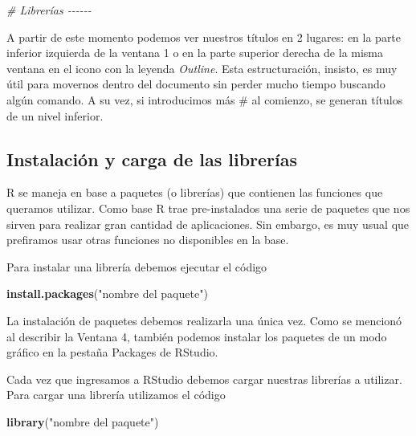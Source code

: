 \documentclass[
]{article}
\newenvironment{Shaded}{\begin{snugshade}}{\end{snugshade}}
\newcommand{\CommentTok}[1]{\textcolor[rgb]{0.56,0.35,0.01}{\textit{#1}}}
\newcommand{\FunctionTok}[1]{\textcolor[rgb]{0.13,0.29,0.53}{\textbf{#1}}}
\newcommand{\NormalTok}[1]{#1}
\newcommand{\StringTok}[1]{\textcolor[rgb]{0.31,0.60,0.02}{#1}}
\begin{document}
\begin{Shaded}
\begin{Highlighting}[]
\CommentTok{\# Librerías {-}{-}{-}{-}{-}{-}}
\end{Highlighting}
\end{Shaded}

A partir de este momento podemos ver nuestros títulos en 2 lugares: en
la parte inferior izquierda de la ventana 1 o en la parte superior
derecha de la misma ventana en el icono con la leyenda \emph{Outline}.
Esta estructuración, insisto, es muy útil para movernos dentro del
documento sin perder mucho tiempo buscando algún comando. A su vez, si
introducimos más \# al comienzo, se generan títulos de un nivel
inferior.

\subsection{Instalación y carga de las
librerías}\label{instalaciuxf3n-y-carga-de-las-libreruxedas}

R se maneja en base a paquetes (o librerías) que contienen las funciones
que queramos utilizar. Como base R trae pre-instalados una serie de
paquetes que nos sirven para realizar gran cantidad de aplicaciones. Sin
embargo, es muy usual que prefiramos usar otras funciones no disponibles
en la base.

Para instalar una librería debemos ejecutar el código

\begin{Shaded}
\begin{Highlighting}[]
\FunctionTok{install.packages}\NormalTok{(}\StringTok{"nombre del paquete"}\NormalTok{)}
\end{Highlighting}
\end{Shaded}

La instalación de paquetes debemos realizarla una única vez. Como se
mencionó al describir la Ventana 4, también podemos instalar los
paquetes de un modo gráfico en la pestaña Packages de RStudio.

Cada vez que ingresamos a RStudio debemos cargar nuestras librerías a
utilizar. Para cargar una librería utilizamos el código

\begin{Shaded}
\begin{Highlighting}[]
\FunctionTok{library}\NormalTok{(}\StringTok{"nombre del paquete"}\NormalTok{)}
\end{Highlighting}
\end{Shaded}
\end{document}
